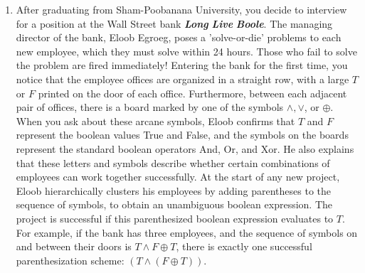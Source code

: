\begin{enumerate}[label=\arabic*.,ref=\thechapter.\arabic*,leftmargin=*,align=left,widest*=99,itemsep=1.5ex plus 0.5ex,resume]
For example:
\[
\begin{array}{l}
(1+ (3\times 2))\times 0+ (1\times 6) +7=13\\
((1+ (3\times 2\times 0) +1)\times 6) +7=19\\
(1+3)\times 2\times (0+1)\times (6+7) =104
\end{array}
\]
\begin{enumerate}
\item Describe and analyze an algorithm to compute the maximum possible value the given expression can take by adding parentheses, assuming all integers in the input are \textit{positive}.
\item Describe and analyze an algorithm to compute the maximum possible value the given expression can take by adding parentheses, assuming all integers in the input are \textit{non-negative}.
\item Describe and analyze an algorithm to compute the maximum possible value the given expression can take by adding parentheses, with no restrictions on the input numbers.
\end{enumerate}
Assume any arithmetic operation takes $O(1)$ time.
\item After graduating from Sham-Poobanana University, you decide to interview for a position at the Wall Street bank \textbf{\textit{Long}} \textbf{\textit{Live}} \textbf{\textit{Boole}}.
The managing director of the bank, Eloob Egroeg, poses a ’solve-or-die’ problems to each new employee, which they must solve within 24 hours.
Those who fail to solve the problem are fired immediately!
Entering the bank for the first time, you notice that the employee offices are organized in a straight row, with a large $T$ or $F$ printed on the door of each office.
Furthermore, between each adjacent pair of offices, there is a board marked by one of the symbols $\wedge ,\vee$, or $\oplus$.
When you ask about these arcane symbols, Eloob confirms that $T$ and $F$ represent the boolean values True and False, and the symbols on the boards represent the standard boolean operators And, Or, and Xor.
He also explains that these letters and symbols describe whether certain combinations of employees can work together successfully.
At the start of any new project, Eloob hierarchically clusters his employees by adding parentheses to the sequence of symbols, to obtain an unambiguous boolean expression.
The project is successful if this parenthesized boolean expression evaluates to $T$.
For example, if the bank has three employees, and the sequence of symbols on and between their doors is $T\wedge F\oplus T$, there is exactly one successful parenthesization scheme: $(T\wedge (F\oplus T))$.

\end{enumerate}
